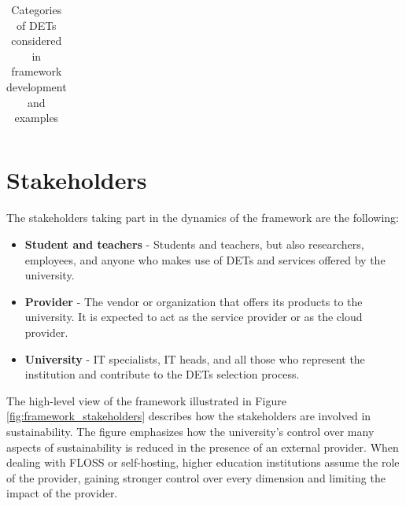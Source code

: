 \begin{table}[ht!]
\begin{tabular}{|>{\centering\arraybackslash}m{6.5cm}|>{\centering\arraybackslash}m{5.5cm}|}
    \end{tabular}
    \caption{Categories of DETs considered in framework development and examples}
    \label{tab:examples_DETs}
\end{table}


\section{Stakeholders}
\label{sec:3.2_stakeholders}
The stakeholders taking part in the dynamics of the framework are the following:
\begin{itemize}[noitemsep, topsep=4pt, parsep=0pt, partopsep=0pt]
    \item \textbf{Student and teachers} - Students and teachers, but also researchers, employees, and anyone who makes use of DETs and services offered by the university.
    \item \textbf{Provider} - The vendor or organization that offers its products to the university. It is expected to act as the service provider or as the cloud provider.
    \item \textbf{University} - IT specialists, IT heads, and all those who represent the institution and contribute to the DETs selection process.
\end{itemize}
\noindent

The high-level view of the framework illustrated in Figure \ref{fig:framework_stakeholders} describes how the stakeholders are involved in sustainability. The figure emphasizes how the university's control over many aspects of sustainability is reduced in the presence of an external provider. When dealing with FLOSS or self-hosting, higher education institutions assume the role of the provider, gaining stronger control over every dimension and limiting the impact of the provider.


